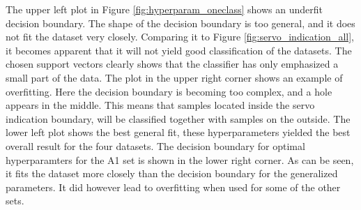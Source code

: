             The upper left plot in Figure \ref{fig:hyperparam_oneclass} shows an underfit decision boundary. The shape of the decision boundary is too general, and it does not fit the dataset very closely. Comparing it to Figure \ref{fig:servo_indication_all}, it becomes apparent that it will not yield good classification of the datasets. The chosen support vectors clearly shows that the classifier has only emphasized a small part of the data. The plot in the upper right corner shows an example of overfitting. Here the decision boundary is becoming too complex, and a hole appears in the middle. This means that samples located inside the servo indication boundary, will be classified together with samples on the outside. The lower left plot shows the best general fit, these hyperparameters yielded the best overall result for the four datasets. The decision boundary for optimal hyperparamters for the A1 set is shown in the lower right corner. As can be seen, it fits the dataset more closely than the decision boundary for the generalized parameters. It did however lead to overfitting when used for some of the other sets.
            
